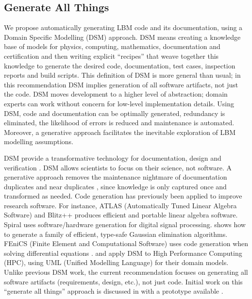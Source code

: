 \documentclass[final, 3p, times, authoryear]{elsarticle}
\begin{document}
\subsection{Generate All Things}

We propose automatically generating LBM code and its documentation, using a
Domain Specific Modelling (DSM) approach. DSM means creating a knowledge base of
models for physics, computing, mathematics, documentation and certification and
then writing explicit ``recipes'' that weave together this knowledge to generate
the desired code, documentation, test cases, inspection reports and build
scripts. This definition of DSM is more general than usual; in this
recommendation DSM implies generation of all software artifacts, not just the
code. DSM moves development to a higher level of abstraction; domain experts can
work without concern for low-level implementation details. Using DSM, code and
documentation can be optimally generated, redundancy is eliminated, the
likelihood of errors is reduced and maintenance is automated. Moreover, a
generative approach facilitates the inevitable exploration of LBM modelling
assumptions.

DSM provide a transformative technology for documentation, design and
verification \citep{JohansonAndHasselbring2018, Smith2018}. DSM allows
scientists to focus on their science, not software.  A generative approach
removes the maintenance nightmare of documentation duplicates and near
duplicates \citep{LucivEtAl2018}, since knowledge is only captured once and
transformed as needed.  Code generation has previously been applied to improve
research software.  For instance, ATLAS (Automatically Tuned Linear Algebra
Software) \citep{WhaleyEtAl2001} and Blitz++ \citep{Veldhuizen1998} produces
efficient and portable linear algebra software.  Spiral \citep{Pueschel2001}
uses software/hardware generation for digital signal processing.
\citet{Carette2008} shows how to generate a family of efficient, type-safe
Gaussian elimination algorithms.  FEniCS (Finite Element and Computational
Software) uses code generation when solving differential equations
\citep{LoggEtAl2012}. \citet{OberEtAl2018} and \citet{MatkerimEtAl2013} apply
DSM to High Performance Computing (HPC), using UML (Unified Modelling Language)
for their domain models. Unlike previous DSM work, the current recommendation
focuses on generating all software artifacts (requirements, design, etc.), not
just code.  Initial work on this ``generate all things'' approach is discussed
in \citep{SzymczakEtAl2016} with a prototype available
\citep{CaretteEtAl2021-Drasil}.
\end{document}
